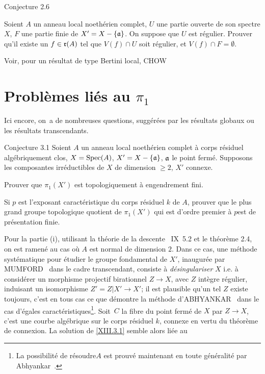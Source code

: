 \label{XIII.2.6}
\begin{enonce*}{Conjecture 2.6\ndemark}

Soient $A$ un anneau local noeth\'erien complet, $U$ une partie ouverte de son spectre $X$, $F$ une partie finie de $X'=X-\{ \mathfrak{a}\}$. On suppose que $U$ est r\'egulier. Prouver qu'il existe un $f \in\mathfrak{r}(A)$ tel que $V(f)\cap U$ soit r\'egulier, et $V(f)\cap F=\emptyset$.
\end{enonce*}

Voir, pour un r\'esultat de type \og Bertini local\fg, CHOW~\cite{XIII.2}

\section{Probl\`emes li\'es au $\pi_1$} \label{XIII.3} Ici encore, on~a de nombreuses questions, sugg\'er\'ees par les r\'esultats globaux ou les r\'esultats transcendants.

\label{XIII.3.1}
\begin{enonce*}{Conjecture 3.1\ndemark} Soient $A$ un anneau local noeth\'erien complet \`a corps r\'esiduel alg\'ebriquement clos, $X=\operatorname{Spec} (A)$, $ X'= X- \{\mathfrak{a}\}$, $\mathfrak{a}$ le point ferm\'e. Supposons les composantes irr\'eductibles de $X$ de dimension $\ge 2$, $X'$ connexe.
\begin{enumeratei}
\item
Prouver que $\pi_1(X')$ est topologiquement \`a engendrement fini.
\item
Si $p$ est l'exposant caract\'eristique du corps r\'esiduel $k$ de $A$, prouver que le plus grand groupe topologique quotient de $\pi_1(X')$ qui est \og d'ordre premier \`a $p$\fg est de pr\'esentation finie.
\end{enumeratei}
\end{enonce*}

Pour la partie (i), utilisant la th\'eorie de la descente ~IX~5.2 et le th\'eor\`eme 2.4, on est ramen\'e au cas o\`u $A$ est normal de dimension $2$. Dans ce cas, une m\'ethode syst\'ematique pour \'etudier le groupe fondamental de $X'$, inaugur\'ee par MUMFORD~\cite{XIII.5} dans le cadre transcendant, consiste \`a \emph{désingulariser} $X$ i.e. \`a consid\'erer un morphisme projectif birationnel $Z\to X$, avec $Z$ int\`egre r\'egulier, induisant un isomorphisme $Z'=Z|X'\to X'$; il est plausible qu'un tel $Z$ existe toujours, c'est en tous cas ce que d\'emontre la m\'ethode d'ABHYANKAR~\cite{XIII.1} dans le cas d'\og \'egales caract\'eristiques{\fg}\footnote{La possibilit\'e de \og r\'esoudre\fg $A$ est prouv\'e maintenant en toute g\'en\'eralit\'e par Abhyankar~\cite{XIII.8}.}. Soit~$C$ la fibre du point ferm\'e de $X$ par $Z\to X$, c'est une courbe alg\'ebrique sur le corps r\'esiduel $k$, connexe en vertu du th\'eor\`eme de connexion. La solution de \ref{XIII.3.1} semble alors li\'ee au

